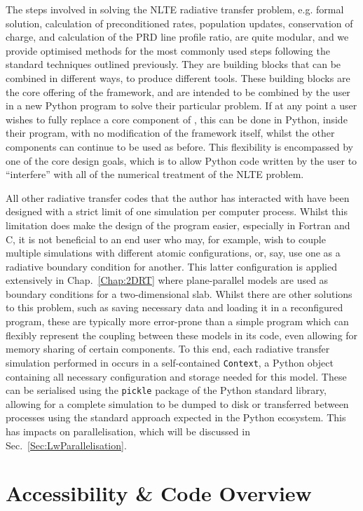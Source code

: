 The steps involved in solving the NLTE radiative transfer problem, e.g. formal solution, calculation of preconditioned rates, population updates, conservation of charge, and calculation of the PRD line profile ratio, are quite modular, and we provide optimised methods for the most commonly used steps following the standard techniques outlined previously.
They are building blocks that can be combined in different ways, to produce different tools.
These building blocks are the core offering of the \Lw{} framework, and are intended to be combined by the user in a new Python program to solve their particular problem.
If at any point a user wishes to fully replace a core component of \Lw{}, this can be done in Python, inside their program, with no modification of the framework itself, whilst the other components can continue to be used as before.
This flexibility is encompassed by one of the core design goals, which is to allow Python code written by the user to ``interfere'' with all of the numerical treatment of the NLTE problem.

All other radiative transfer codes that the author has interacted with have been designed with a strict limit of one simulation per computer process.
Whilst this limitation does make the design of the program easier, especially in Fortran and C, it is not beneficial to an end user who may, for example, wish to couple multiple simulations with different atomic configurations, or, say, use one as a radiative boundary condition for another.
This latter configuration is applied extensively in Chap.~\ref{Chap:2DRT} where plane-parallel models are used as boundary conditions for a two-dimensional slab.
Whilst there are other solutions to this problem, such as saving necessary data and loading it in a reconfigured program, these are typically more error-prone than a simple program which can flexibly represent the coupling between these models in its code, even allowing for memory sharing of certain components.
To this end, each radiative transfer simulation performed in \Lw{} occurs in a self-contained \texttt{Context}, a Python object containing all necessary configuration and storage needed for this model.
These can be serialised using the \texttt{pickle} package of the Python standard library, allowing for a complete simulation to be dumped to disk or transferred between processes using the standard approach expected in the Python ecosystem.
This has impacts on parallelisation, which will be discussed in Sec.~\ref{Sec:LwParallelisation}.

\section{Accessibility \& Code Overview}\label{Sec:LwCodeOverview}

